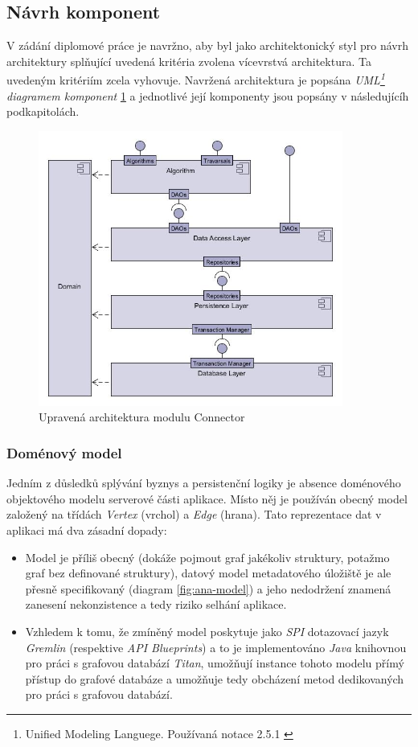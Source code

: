 \subsection{Návrh komponent}
\label{sec:des_components}
V zádání diplomové práce je navržno, aby byl jako architektonický styl pro návrh architektury splňující uvedená kritéria zvolena vícevrstvá architektura. Ta uvedeným kritériím zcela vyhovuje. Navržená architektura je popsána \textit{UML\footnote{Unified Modeling Languege. Používaná notace 2.5.1 \cite{UML17}} diagramem komponent} \ref{fig:des-connector} a jednotlivé její komponenty jsou popsány v následujícíh podkapitolách.

\begin{figure}
\begin{center}
\includegraphics[width=10cm]{figures/connector_modules}
\caption{Upravená architektura modulu Connector}
\label{fig:des-connector}
\end{center}
\end{figure}

\subsubsection{Doménový model}
\label{sec:des_domain}
Jedním z důsledků splývání byznys a persistenční logiky je absence doménového objektového modelu serverové části aplikace. Místo něj je používán obecný model založený na třídách \textit{Vertex} (vrchol) a \textit{Edge} (hrana). Tato reprezentace dat v aplikaci má dva zásadní dopady:

\begin{itemize}
   \item Model je příliš obecný (dokáže pojmout graf jakékoliv struktury, potažmo graf bez definované struktury), datový model metadatového úložiště je ale přesně specifikovaný (diagram \ref{fig:ana-model}) a jeho nedodržení znamená zanesení nekonzistence a tedy riziko selhání aplikace.
   \item Vzhledem k tomu, že zmíněný model poskytuje jako \textit{SPI} dotazovací jazyk \textit{Gremlin} (respektive \textit{API Blueprints}) a to je implementováno \textit{Java} knihovnou pro práci s grafovou databází \textit{Titan}, umožňují instance tohoto modelu přímý přístup do grafové databáze a umožňuje tedy obcházení metod dedikovaných pro práci s grafovou databází.
\end{itemize}

